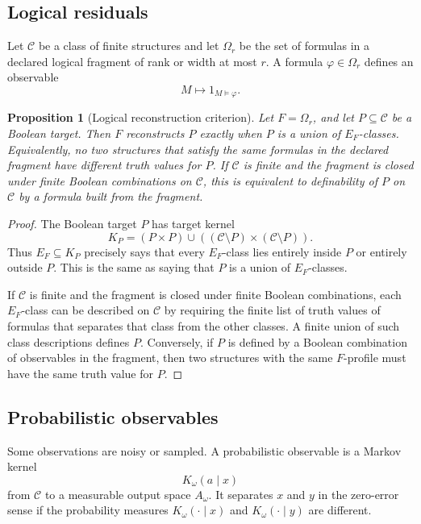 \documentclass[11pt]{article}
\newtheorem{proposition}[theorem]{Proposition}
\theoremstyle{definition}
\theoremstyle{remark}
\begin{document}
\subsection{Logical residuals}

Let \(\mathcal C\) be a class of finite structures and let \(\Omega_r\) be the set of formulas in a declared logical fragment of rank or width at most \(r\).  A formula \(\varphi\in\Omega_r\) defines an observable
\[
M\mapsto 1_{M\models\varphi}.
\]

\begin{proposition}[Logical reconstruction criterion]
Let \(F=\Omega_r\), and let \(P\subseteq\mathcal C\) be a Boolean target.  Then \(F\) reconstructs \(P\) exactly when \(P\) is a union of \(E_F\)-classes.  Equivalently, no two structures that satisfy the same formulas in the declared fragment have different truth values for \(P\).  If \(\mathcal C\) is finite and the fragment is closed under finite Boolean combinations on \(\mathcal C\), this is equivalent to definability of \(P\) on \(\mathcal C\) by a formula built from the fragment.
\end{proposition}

\begin{proof}
The Boolean target \(P\) has target kernel
\[
K_P=(P\times P)\cup((\mathcal C\setminus P)\times(\mathcal C\setminus P)).
\]
Thus \(E_F\subseteq K_P\) precisely says that every \(E_F\)-class lies entirely inside \(P\) or entirely outside \(P\).  This is the same as saying that \(P\) is a union of \(E_F\)-classes.

If \(\mathcal C\) is finite and the fragment is closed under finite Boolean combinations, each \(E_F\)-class can be described on \(\mathcal C\) by requiring the finite list of truth values of formulas that separates that class from the other classes.  A finite union of such class descriptions defines \(P\).  Conversely, if \(P\) is defined by a Boolean combination of observables in the fragment, then two structures with the same \(F\)-profile must have the same truth value for \(P\).
\end{proof}

\subsection{Probabilistic observables}

Some observations are noisy or sampled.  A probabilistic observable is a Markov kernel
\[
K_\omega(a\mid x)
\]
from \(\mathcal C\) to a measurable output space \(A_\omega\).  It separates \(x\) and \(y\) in the zero-error sense if the probability measures \(K_\omega(\cdot\mid x)\) and \(K_\omega(\cdot\mid y)\) are different.
\end{document}
